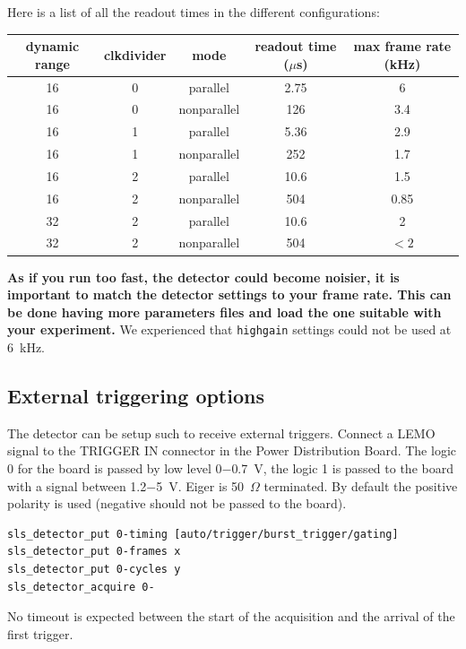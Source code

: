 \documentclass{article}
\begin{document}
Here is a list of all the readout times in the different configurations:
\ \\
\begin{tabular}{|c|c|c|c|c|}
\hline
dynamic range & clkdivider & mode & readout time ($\mu$s) & max frame rate (kHz)\\
\hline
16 & 0 & parallel & 2.75 & 6\\
\hline
16 & 0 & nonparallel &  126 & 3.4\\
\hline
16 & 1 & parallel &  5.36 & 2.9\\
\hline
16 & 1 & nonparallel & 252 & 1.7\\
\hline
16 & 2 & parallel &  10.6 & 1.5\\
\hline
16 & 2 & nonparallel & 504 & 0.85\\
\hline
32 & 2 & parallel &  10.6 & 2\\
\hline
32 & 2 & nonparallel & 504 & $<2$\\
\hline
\end{tabular}

\textbf{As if you run too fast, the detector could become noisier, it is important to match the detector settings to your frame rate. This can be done having more parameters files and load the one suitable with your experiment.} We experienced that {\tt{highgain}} settings could not be used at 6~kHz.


\subsection{External triggering options}
The detector can be setup such to receive external triggers. Connect a LEMO signal to the TRIGGER IN connector in the Power Distribution Board. The logic 0 for the board is passed by low level 0$-$0.7~V, the logic 1 is passed to the board with a signal between 1.2$-$5~V. Eiger is 50~$\Omega$ terminated. By default the positive polarity is used (negative should not be passed to the board).  
\begin{verbatim}
sls_detector_put 0-timing [auto/trigger/burst_trigger/gating]
sls_detector_put 0-frames x
sls_detector_put 0-cycles y
sls_detector_acquire 0-
\end{verbatim}
No timeout is expected between the start of the acquisition and the arrival of the first trigger. 
\end{document}
